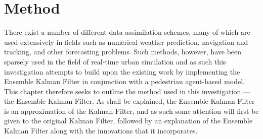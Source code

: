 \section{Method}\label{sec:method}


There exist a number of different data assimilation schemes, many of which are
used extensively in fields such as numerical weather prediction, navigation and
tracking, and other forecasting problems.
Such methods, however, have been sparsely used in the field of real-time urban
simulation and as such this investigation attempts to build upon the existing
work by implementing the Ensemble Kalman Filter in conjunction with a pedestrian
agent-based model.
This chapter therefore seeks to outline the method used in this investigation
--- the Ensemble Kalman Filter.
As shall be explained, the Ensemble Kalman Filter is an approximation of the
Kalman Filter, and as such some attention will first be given to the original
Kalman Filter, followed by an explanation of the Ensemble Kalman Filter along
with the innovations that it incorporates.

